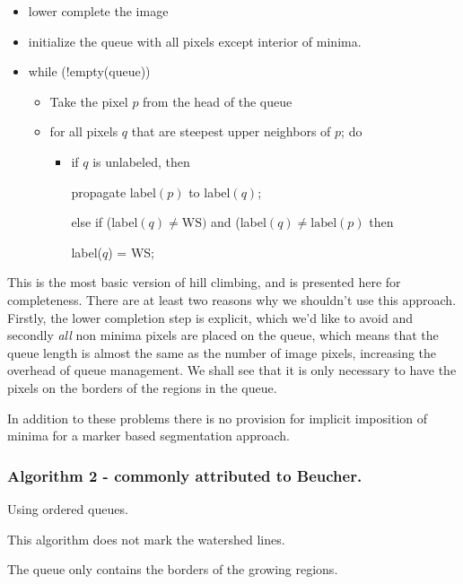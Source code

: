 \documentclass{InsightArticle}
\begin{document}
\begin{itemize}
\item lower complete the image
\item initialize the queue with all pixels except interior of minima.
\item while (!empty(queue))
   \begin{itemize}
	\item Take the pixel $p$ from the head of the queue
        \item for all pixels $q$ that are steepest upper neighbors of $p$; do
        \begin{itemize}
         \item  if $q$ is unlabeled, then 

propagate label$(p)$ to label$(q)$;

                else if (label$(q) \ne \mbox{WS})$ and  (label$(q) \ne \mbox{label}(p)$ then

                  label($q$) = WS;
	\end{itemize}

   \end{itemize}
\end{itemize}

This is the most basic version of hill climbing, and is presented here
for completeness. There are at least two reasons why we shouldn't use
this approach. Firstly, the lower completion step is explicit, which
we'd like to avoid and secondly {\em all} non minima pixels are placed
on the queue, which means that the queue length is almost the same as
the number of image pixels, increasing the overhead of queue
management. We shall see that it is only necessary to have the pixels
on the borders of the regions in the queue.

In addition to these problems there is no provision for implicit
imposition of minima for a marker based segmentation approach.


\subsubsection{Algorithm 2 - commonly attributed to Beucher.}
\label{sect:BeucherAlgorithm}

Using ordered queues.

This algorithm does not mark the watershed lines.

The queue only contains the borders of the growing regions.
\end{document}
